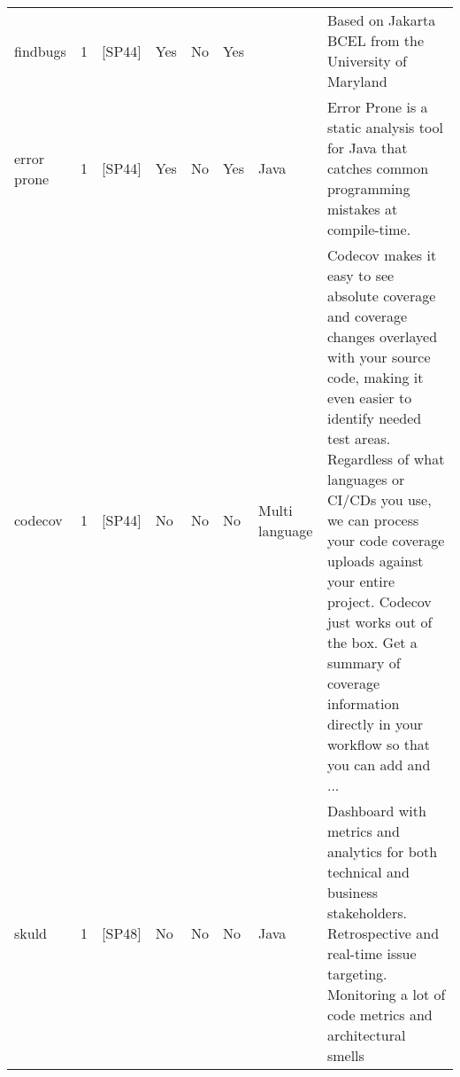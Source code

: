 \begin{tabular}{lrllllll}
            findbugs &      1 &                                                 [SP44] &   Yes &       No &       Yes &                                                                                                                                                                                         &                                                                                                                                                                                                                                                                                                                                                            Based on Jakarta BCEL from the University of Maryland \\
         error prone &      1 &                                                 [SP44] &   Yes &       No &       Yes &                                                                                                                                                                                    Java &                                                                                                                                                                                                                                                                                                         Error Prone is a static analysis tool for Java that catches common programming mistakes at compile-time. \\
             codecov &      1 &                                                 [SP44] &    No &       No &        No &                                                                                                                                                                          Multi language &  Codecov makes it easy to see absolute coverage and coverage changes overlayed with your source code, making it even easier to identify needed test areas. Regardless of what languages or CI/CDs you use, we can process your code coverage uploads against your entire project. Codecov just works out of the box. Get a summary of coverage information directly in your workflow so that you can add and ... \\
               skuld &      1 &                                                 [SP48] &    No &       No &        No &                                                                                                                                                                                    Java &                                                                                                                                                                                                                        Dashboard with metrics and analytics for both technical and business stakeholders. Retrospective and real-time issue targeting. Monitoring a lot of code metrics and architectural smells \\

\end{tabular}
